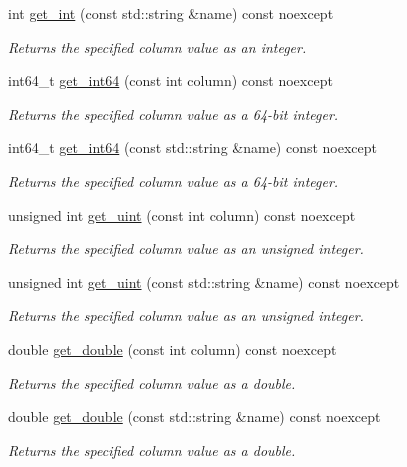 \begin{DoxyCompactItemize}
int \hyperlink{a00010_a7e1f86fdffd271cb92deb0b21d22fd05}{get\-\_\-int} (const std\-::string \&name) const noexcept
\begin{DoxyCompactList}\small\item\em Returns the specified column value as an integer. \end{DoxyCompactList}\item 
int64\-\_\-t \hyperlink{a00010_afaf16f586744a6bc0ecfb74ab791306c}{get\-\_\-int64} (const int column) const noexcept
\begin{DoxyCompactList}\small\item\em Returns the specified column value as a 64-\/bit integer. \end{DoxyCompactList}\item 
int64\-\_\-t \hyperlink{a00010_a87383f607d2ffc2875eac57ecf8e3989}{get\-\_\-int64} (const std\-::string \&name) const noexcept
\begin{DoxyCompactList}\small\item\em Returns the specified column value as a 64-\/bit integer. \end{DoxyCompactList}\item 
unsigned int \hyperlink{a00010_a02e09a2778e2f4d146ef02cd6c9e86df}{get\-\_\-uint} (const int column) const noexcept
\begin{DoxyCompactList}\small\item\em Returns the specified column value as an unsigned integer. \end{DoxyCompactList}\item 
unsigned int \hyperlink{a00010_a662bad64308f5995cb03a0ccb772acdc}{get\-\_\-uint} (const std\-::string \&name) const noexcept
\begin{DoxyCompactList}\small\item\em Returns the specified column value as an unsigned integer. \end{DoxyCompactList}\item 
double \hyperlink{a00010_aa4052f3e593580c81ba2b8622e2652eb}{get\-\_\-double} (const int column) const noexcept
\begin{DoxyCompactList}\small\item\em Returns the specified column value as a double. \end{DoxyCompactList}\item 
double \hyperlink{a00010_a0613aae6ee73cd54d7f7d0d711494737}{get\-\_\-double} (const std\-::string \&name) const noexcept
\begin{DoxyCompactList}\small\item\em Returns the specified column value as a double. \end{DoxyCompactList}\item 

\end{DoxyCompactItemize}
